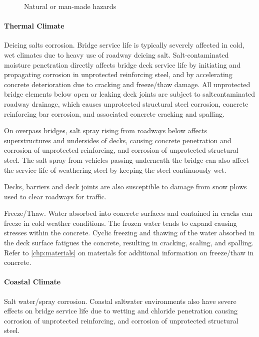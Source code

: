 \begin{figure}
  \caption{Natural or man-made hazards}\label{fig:natural-man-made-hazards}
\end{figure}

\paragraph{Thermal Climate}
Deicing salts corrosion. Bridge service life is typically severely affected in cold, wet climates due to heavy use of roadway deicing salt. Salt-contaminated moisture penetration directly affects bridge deck service life by initiating and propagating corrosion in unprotected reinforcing steel, and by accelerating concrete deterioration due to cracking and freeze/thaw damage. All unprotected bridge elements below open or leaking deck joints are subject to saltcontaminated roadway drainage, which causes unprotected structural steel corrosion, concrete reinforcing bar corrosion, and associated concrete cracking and spalling.

On overpass bridges, salt spray rising from roadways below affects superstructures and undersides of decks,
causing concrete penetration and corrosion of unprotected reinforcing, and corrosion of unprotected structural steel.
The salt spray from vehicles passing underneath the bridge can also affect the service life of weathering steel by
keeping the steel continuously wet.

Decks, barriers and deck joints are also susceptible to damage from snow plows used to clear roadways for
traffic.

Freeze/Thaw. Water absorbed into concrete surfaces and contained in cracks can freeze in cold weather
conditions. The frozen water tends to expand causing stresses within the concrete. Cyclic freezing and thawing of the
water absorbed in the deck surface fatigues the concrete, resulting in cracking, scaling, and spalling. Refer to
\cref{chp:materials} on materials for additional information on freeze/thaw in concrete.

\paragraph{Coastal Climate}
Salt water/spray corrosion. Coastal saltwater environments also have severe effects on bridge service life due
to wetting and chloride penetration causing corrosion of unprotected reinforcing, and corrosion of unprotected
structural steel.

